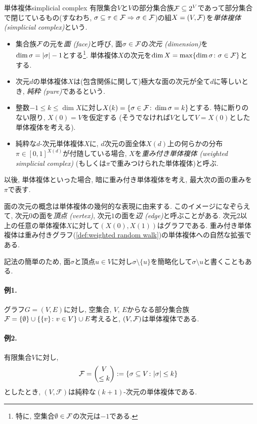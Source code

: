 \begin{definition}{単体複体}{simplicial complex}
有限集合$V$と$V$の部分集合族$\F\subseteq 2^V$であって部分集合で閉じているもの(すなわち, $\sigma\subseteq \tau \in \F \Rightarrow \sigma\in \F$)の組$X=(V,\F)$を\emph{単体複体 (simplicial complex)}という.
\begin{itemize}
\item 集合族$\F$の元を\emph{面 (face)}と呼び,
面$\sigma \in \F$の\emph{次元 (dimension)}を$\dim \sigma = \abs{\sigma} - 1$とする\footnote{特に, 空集合$\emptyset \in \F$の次元は$-1$である.}.
単体複体$X$の次元を$\dim X = \max\cbra{\dim \sigma \colon \sigma \in \F}$とする.

\item 次元$d$の単体複体$X$は(包含関係に関して)極大な面の次元が全て$d$に等しいとき, \emph{純粋 (pure)}であるという.

\item 整数$-1 \le k \le \dim X$に対し$X(k) = \cbra*{\sigma \in \F\colon \dim \sigma = k }$とする.
特に断りのない限り, $X(0)=V$を仮定する
(そうでなければ$V$として$V=X(0)$とした単体複体を考える).

\item 純粋な$d$-次元単体複体$X$に, $d$次元の面全体$X(d)$上の何らかの分布$\pi \in [0,1]^{X(d)}$が付随している場合, $X$を\emph{重み付き単体複体 (weighted simplicial complex)} (もしくは$\pi$で重みつけられた単体複体)と呼ぶ.
\end{itemize}
以後, 単体複体といった場合, 暗に重み付き単体複体を考え, 最大次の面の重みを$\pi$で表す.
\end{definition}
面の次元の概念は単体複体の幾何的な表現に由来する.
このイメージになぞらえて,
次元$0$の面を\emph{頂点 (vertex)}, 次元$1$の面を\emph{辺 (edge)}と呼ぶことがある.
次元$2$以上の任意の単体複体$X$に対して$(X(0),X(1))$はグラフである.
重み付き単体複体は重み付きグラフ(\cref{def:weighted random walk})の単体複体への自然な拡張である.

記法の簡単のため, 面$\sigma$と頂点$u\in V$に対し$\sigma \setminus \{u\}$を簡略化して$\sigma \setminus u$と書くこともある.

\paragraph*{例1.}
グラフ$G=(V,E)$に対し, 空集合, $V$, $E$からなる部分集合族
$\F = \{\emptyset\} \cup \cbra*{\{v\}\colon v \in V} \cup E$考えると,
$(V,\F)$は単体複体である.

\paragraph*{例2.}
有限集合$V$に対し,
\begin{align}
    \F = \binom{V}{\le k} \defeq \cbra*{ \sigma \subseteq V \colon |\sigma|\le k} \label{eq:uniform matroid}
\end{align}
としたとき, $(V,\mathcal{F})$は純粋な$(k+1)$-次元の単体複体である.

